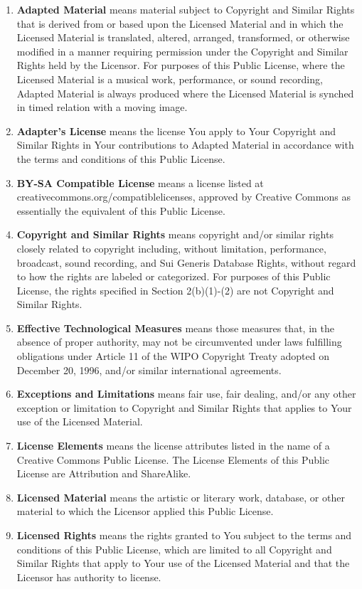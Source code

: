 \begin{enumerate}
\item \textbf{Adapted Material} means material subject to Copyright and Similar Rights that is derived from or based upon the Licensed Material and in which the Licensed Material is translated, altered, arranged, transformed, or otherwise modified in a manner requiring permission under the Copyright and Similar Rights held by the Licensor. For purposes of this Public License, where the Licensed Material is a musical work, performance, or sound recording, Adapted Material is always produced where the Licensed Material is synched in timed relation with a moving image.
\item \textbf{Adapter's License} means the license You apply to Your Copyright and Similar Rights in Your contributions to Adapted Material in accordance with the terms and conditions of this Public License.
\item \textbf{BY-SA Compatible License} means a license listed at  creativecommons.org/compatiblelicenses, approved by Creative Commons as essentially the equivalent of this Public License.
\item \textbf{Copyright and Similar Rights} means copyright and/or similar rights closely related to copyright including, without limitation, performance, broadcast, sound recording, and Sui Generis Database Rights, without regard to how the rights are labeled or categorized. For purposes of this Public License, the rights specified in Section 2(b)(1)-(2) are not Copyright and Similar Rights.
\item \textbf{Effective Technological Measures} means those measures that, in the absence of proper authority, may not
be circumvented under laws fulfilling obligations under Article 11 of the WIPO Copyright Treaty adopted on December 20, 1996, and/or similar
international agreements.
\item \textbf{Exceptions and Limitations} means fair use, fair dealing, and/or any other exception or limitation to Copyright and Similar Rights that applies to Your use of the Licensed Material.
\item \textbf{License Elements} means the license attributes listed in the name of a Creative Commons Public License. The License Elements of this Public License are Attribution and ShareAlike.
\item \textbf{Licensed Material} means the artistic or literary work, database, or other material to which the Licensor applied this Public License.
\item \textbf{Licensed Rights} means the rights granted to You subject to the terms and conditions of this Public License, which are limited to all Copyright and Similar Rights that apply to Your use of the Licensed Material and that the Licensor has authority to license.

\end{enumerate}

